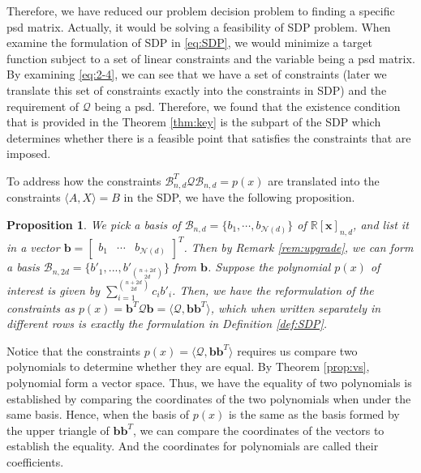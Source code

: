 \documentclass[12pt]{amsart}
\numberwithin{equation}{section}
\newtheorem{prop}[thm]{Proposition}
\theoremstyle{definition}
\numberwithin{thm}{section}
\begin{document}
\smallskip
Therefore, we have reduced our problem decision problem to finding a specific psd matrix. 
Actually, it would be solving a feasibility of SDP problem.
When examine the formulation of SDP in \eqref{eq:SDP}, we would minimize a target function subject to a set of linear constraints and the variable being a psd matrix. 
By examining \eqref{eq:2-4}, we can see that we have a set of constraints (later we translate this set of constraints exactly into the constraints in SDP) 
and the requirement of $\mathcal{Q}$ being a psd.
Therefore, we found that the existence condition that is provided in the Theorem \ref{thm:key} is the subpart of the SDP
which determines whether there is a feasible point that satisfies the constraints that are imposed. 

To address how the constraints $\mathcal{B}_{n, d} ^ T \mathcal{Q} \mathcal{B}_{n, d} = p(x)$ are translated into the constraints $\langle A, X \rangle = B$ in the SDP, we have the following proposition.

\begin{prop}
     \label{prop:2.19}
     We pick a basis of $\mathcal{B}_{n, d} = \{b_1, \cdots, b_{\mathcal{N}(d)}\}$ of $\mathbb{R}[\mathbf{x}]_{n, d}$, and list it in a vector $ \mathbf{b} =\begin{bmatrix}
          b_1 &
          \cdots &
          b_{\mathcal{N}(d)}
     \end{bmatrix} ^ T$. Then by Remark \ref{rem:upgrade}, we can form a basis $\mathcal{B}_{n, 2d} = \{b'_1, ..., b'_{n + 2d \choose 2d}\}$ from $\mathbf{b}$. 
     Suppose the polynomial $p(x)$ of interest is given by $\sum_{i = 1}^{n + 2d \choose 2d } c_i b'_i$.
     Then, we have the reformulation of the constraints as $p(x) = \mathbf{b}^T \mathcal{Q} \mathbf{b} = \langle \mathcal{Q}, \mathbf{bb}^T \rangle$, 
     which when written separately in different rows is exactly the formulation in Definition \ref{def:SDP}.
\end{prop}

Notice that the constraints $p(x) = \langle \mathcal{Q}, \mathbf{bb}^T \rangle$ requires us compare two polynomials to determine whether they are equal. 
By Theorem \ref{prop:vs}, polynomial form a vector space. 
Thus, we have the equality of two polynomials is established by comparing the coordinates of the two polynomials when under the same basis. 
Hence, when the basis of $p(x)$ is the same as the basis formed by the upper triangle of $\mathbf{bb}^T$, we can compare the 
coordinates of the vectors to establish the equality. And the coordinates for polynomials are called their coefficients. 
\end{document}
